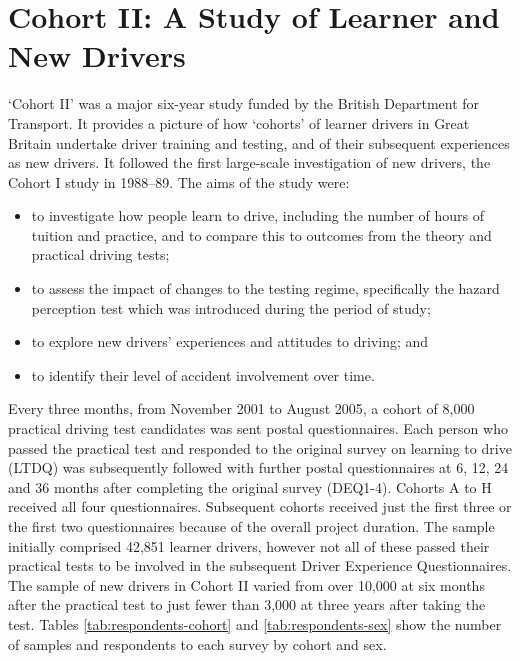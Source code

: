 \documentclass[runningheads]{llncs}
\begin{document}
%
%
\section{Cohort II: A Study of Learner and New Drivers}\label{sec:cohortii}
`Cohort II' was a major six-year study funded by the British Department for Transport. It provides a picture of how `cohorts’ of learner drivers in Great Britain undertake driver training and testing, and of their subsequent experiences as new drivers. It followed the first large-scale investigation of new drivers, the Cohort I study in 1988–89. The aims of the study were:
\begin{itemize}[topsep=0pt]
    \item to investigate how people learn to drive, including the number of hours of tuition and practice, and to compare this to outcomes from the theory and practical driving tests;
    \item to assess the impact of changes to the testing regime, specifically the hazard perception test which was introduced during the period of study;
    \item to explore new drivers’ experiences and attitudes to driving; and
    \item to identify their level of accident involvement over time.
\end{itemize}
Every three months, from November 2001 to August 2005, a cohort of 8,000 practical driving test candidates was sent postal questionnaires. Each person who passed the practical test and responded to the original survey on learning to drive (LTDQ) was subsequently followed with further postal questionnaires at 6, 12, 24 and 36 months after completing the original survey (DEQ1-4). Cohorts A to H received all four questionnaires. Subsequent cohorts received just the first three or the first two questionnaires because of the overall project duration.
The sample initially comprised 42,851 learner drivers, however not all of these passed their practical tests to be involved in the subsequent Driver Experience Questionnaires. The sample of new drivers in Cohort II varied from over 10,000 at six months after the practical test to just fewer than 3,000 at three years after taking the test. Tables \ref{tab:respondents-cohort} and \ref{tab:respondents-sex} show the number of samples and respondents to each survey by cohort and sex. 
\vspace{2ex}
\end{document}
